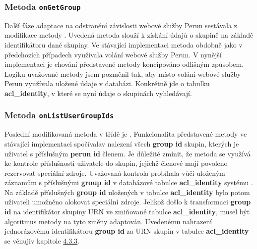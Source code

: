 \documentclass[
  printed, %
  twoside, %
  table,   %
  nolof,     %
  nolot,     %
]{fithesis3}
\begin{document}
\subsubsection{Metoda \texttt{onGetGroup}}

Další fáze adaptace na odstranění závislosti webové služby Perun sestávala z modifikace metody . Uvedená metoda  slouží k získání údajů o skupině na základě identifikátoru dané skupiny. Ve stávající implementaci metoda obdobně jako v předchozích případech využívala volání webové služby Perun. V nynější implementaci je chování představené metody koncipováno odlišným způsobem. Logiku uvažované metody  jsem pozměnil tak, aby místo volání webové služby Perun využívala uložené údaje v databázi. Konkrétně jde o tabulku \textbf{acl\_identity}, v které se nyní údaje o skupinách vyhledávají. 

\subsubsection{Metoda \texttt{onListUserGroupIds}}
Poslední modifikovaná metoda v třídě  je . Funkcionalita představené metody ve stávající implementaci spočívala\break v nalezení všech \textbf{group id} skupin, kterých je uživatel s příslušným \textbf{perun id} členem. Je důležité zmínit, že metoda  se využívá ke kontrole příslušnosti uživatele do skupin, jejichž členové mají povoleno rezervovat speciální zdroje. Uvažovaná kontrola probíhala vůči uloženým záznamům s příslušnými \textbf{group id} v databázové tabulce \textbf{acl\_identity} systému . Na základě příslušných \textbf{group id} uložených v tabulce \textbf{acl\_identity} bylo potom uživateli umožněno alokovat speciální zdroje. Jelikož došlo k transformaci \textbf{group id} na identifikátor skupiny URN ve zmiňované tabulce \textbf{acl\_identity}, musel být algoritmus metody  na tyto změny adaptován. Uvedenému nahrazení jednorázovému identifikátoru \textbf{group id} za URN skupin v tabulce \textbf{acl\_identity} se věnuji\break v kapitole \hyperref[zpracovaniAUlozeniPerun]{4.3.3}. 

\par
\end{document}
